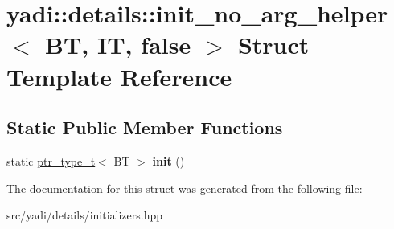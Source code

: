 \hypertarget{structyadi_1_1details_1_1init__no__arg__helper_3_01_b_t_00_01_i_t_00_01false_01_4}{}\section{yadi\+:\+:details\+:\+:init\+\_\+no\+\_\+arg\+\_\+helper$<$ BT, IT, false $>$ Struct Template Reference}
\label{structyadi_1_1details_1_1init__no__arg__helper_3_01_b_t_00_01_i_t_00_01false_01_4}
\subsection*{Static Public Member Functions}
\begin{DoxyCompactItemize}
\item 
\mbox{\label{structyadi_1_1details_1_1init__no__arg__helper_3_01_b_t_00_01_i_t_00_01false_01_4_a43b81409264cbd054bab2f66a886c47b}} 
static \hyperlink{namespaceyadi_a92290eb27cd90666aa87b17d854af9fe}{ptr\+\_\+type\+\_\+t}$<$ BT $>$ {\bfseries init} ()
\end{DoxyCompactItemize}


The documentation for this struct was generated from the following file\+:\begin{DoxyCompactItemize}
\item 
src/yadi/details/initializers.\+hpp\end{DoxyCompactItemize}

